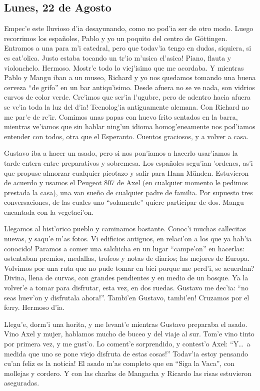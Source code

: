 \subsection*{Lunes, 22 de Agosto}

Empec'e este lluvioso d'ia desayunando, como no pod'ia ser de otro modo. Luego
recorrimos los espa\~noles, Pablo y yo un poquito del centro de G\"ottingen.
Entramos a una para m'i catedral, pero que todav'ia tengo en dudas, siquiera, si
es cat'olica. \textexclamdown Justo estaba tocando un tr'io m'usica cl'asica!
Piano, flauta y violonchelo. Hermoso. Mostr'e todo lo viej'isimo que me
acordaba. Y mientras Pablo y Mangu iban a un museo, Richard y yo nos quedamos
tomando una buena cerveza ``de grifo'' en un bar antiqu'isimo. Desde afuera no
se ve nada, son vidrios curvos de color verde. Cre'imos que ser'ia l'ugubre,
\textexclamdown pero de adentro hacia afuera se ve'ia toda la luz del d'ia!
Tecnolog'ia antiguamente alemana. Con Richard no me par'e de re'ir. Comimos unas
papas con huevo frito sentados en la barra, mientras ve'iamos que sin hablar
ning'un idioma homog'eneamente nos pod'iamos entender con todos, otra que el
Esperanto. Cuentos graciosos, y a volver a casa.

Gustavo iba a hacer un asado, pero si nos pon'iamos a hacerlo
usar'iamos la tarde entera entre preparativos y sobremesa. Los espa\~noles
segu'ian 'ordenes, as'i que propuse almorzar cualquier picotazo y salir para
Hann M\"unden. Estuvieron de acuerdo y usamos el Peugeot 807 de Axel (en
cualquier momento le pedimos prestada la casa), una van sue\~no de cualquier
padre de familia. Por supuesto tres conversaciones, de las cuales uno
``solamente'' quiere participar de dos. Mangu encantada con la vegetaci'on.

Llegamos al hist'orico pueblo y caminamos bastante. Conoc'i muchas callecitas
nuevas, y saqu'e m'as fotos. \textexclamdown Vi edificios antiguos, en relaci'on
a los que ya hab'ia conocido! Paramos a comer una salchicha en un lugar
``campe'on'' en hacerlas: ostentaban premios, medallas, trofeos y notas de
diarios; las mejores de Europa. Volvimos por una ruta que no pude tomar en
bici porque me perd'i, \textquestiondown se acuerdan? Divina, llena de curvas,
con grandes pendientes y en medio de un bosque. Ya la volver'e a tomar para
disfrutar, esta vez, en dos ruedas. Gustavo me dec'ia: ``\textexclamdown no seas
huev'on y disfrutala ahora!''. Tambi'en Gustavo, \textexclamdown tambi'en!
Cruzamos por el ferry. Hermoso d'ia.

Llegu'e, dorm'i una horita, y me levant'e mientras Gustavo preparaba el asado.
Vino Axel y mujer, hablamos mucho de buceo y del viaje al sur. Tom'e vino tinto
por primera vez, y me gust'o. Lo coment'e sorprendido, y contest'o Axel:
``Y\ldots\ \textexclamdown a medida que uno se pone viejo disfruta de estas
cosas!'' \textexclamdown Todav'ia estoy pensando cu'an feliz es la noticia! El
asado m'as completo que en ``Siga la Vaca'', con mollejas y cordero. Y con las
charlas de Mangacha y Ricardo las risas estuvieron aseguradas.

